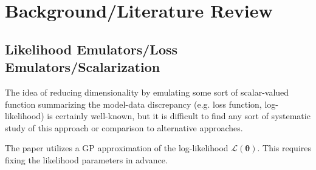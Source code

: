 \documentclass[12pt]{article}
\newcommand{\btheta}{\boldsymbol{\theta}}
\begin{document}
\section{Background/Literature Review}
 
 \subsection{Likelihood Emulators/Loss Emulators/Scalarization}
 The idea of reducing dimensionality by emulating some sort of scalar-valued function summarizing the model-data discrepancy (e.g. loss function, log-likelihood) is certainly well-known, but 
 it is difficult to find any sort of systematic study of this approach or comparison to alternative approaches. 
 
 The paper \cite{LEBEL2019158} utilizes a GP approximation of the log-likelihood 
 $\mathcal{L}(\btheta)$. This requires fixing the likelihood parameters in advance. 
 
\end{document}
